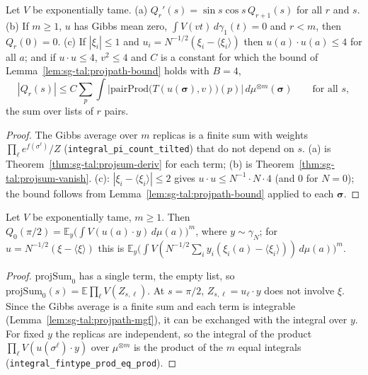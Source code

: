 \begin{lemma}
\label{lem:sg-tal:gibbs-chain}
  \leanok
{}
Let $V$ be exponentially tame.  (a) $Q_r'(s)=\sin s\cos s\,Q_{r+1}(s)$ for all $r$ and $s$.  (b) If $m\ge1$, $u$ has Gibbs mean zero, $\int V(vt)\,d\gamma_1(t)=0$ and $r<m$, then $Q_r(0)=0$.
(c) If $|\xi_i|\le1$ and $u_i=N^{-1/2}(\xi_i-\langle\xi_i\rangle)$ then $u(a)\cdot u(a)\le4$ for all $a$; and if $u\cdot u\le4$, $v^2\le4$ and $C$ is a constant for which the bound of Lemma~\ref{lem:sg-tal:projpath-bound} holds with $B=4$,
\[
|Q_r(s)|\le C\sum_{p}\int\bigl|\mathrm{pairProd}\bigl(T(u(\boldsymbol\sigma),v)\bigr)(p)\bigr|\,d\mu^{\otimes m}(\boldsymbol\sigma)\qquad\text{for all }s,
\]
the sum over lists of $r$ pairs.
\end{lemma}
\begin{proof}
  \leanok
The Gibbs average over $m$ replicas is a finite sum with weights $\prod_\ell e^{f(\sigma^\ell)}/Z$ (\texttt{integral\_pi\_count\_tilted}) that do not depend on $s$.  (a) is Theorem~\ref{thm:sg-tal:projsum-deriv} for each term; (b) is Theorem~\ref{thm:sg-tal:projsum-vanish}.
(c): $|\xi_i-\langle\xi_i\rangle|\le2$ gives $u\cdot u\le N^{-1}\cdot N\cdot4$ (and $0$ for $N=0$); the bound follows from Lemma~\ref{lem:sg-tal:projpath-bound} applied to each $\boldsymbol\sigma$.
\end{proof}

\begin{lemma}[The endpoint $s=\pi/2$ is the $m$-th power of the Gibbs average]
\label{lem:sg-tal:gibbs-endpoint}
  \leanok
{}
Let $V$ be exponentially tame, $m\ge1$.  Then $Q_0(\pi/2)=\mathbb E_y\bigl(\int V(u(a)\cdot y)\,d\mu(a)\bigr)^m$, where $y\sim\gamma_N$; for $u=N^{-1/2}(\xi-\langle\xi\rangle)$ this is $\mathbb E_y\bigl(\int V(N^{-1/2}\sum_iy_i(\xi_i(a)-\langle\xi_i\rangle))\,d\mu(a)\bigr)^m$.
\end{lemma}
\begin{proof}
  \leanok
$\mathrm{projSum}_0$ has a single term, the empty list, so $\mathrm{projSum}_0(s)=\mathbb E\prod_\ell V(Z_{s,\ell})$.  At $s=\pi/2$, $Z_{s,\ell}=u_\ell\cdot y$ does not involve $\xi$.  Since the Gibbs average is a finite sum and each term is integrable
(Lemma~\ref{lem:sg-tal:projpath-mgf}), it can be exchanged with the integral over $y$.  For fixed $y$ the replicas are independent, so the integral of the product $\prod_\ell V(u(\sigma^\ell)\cdot y)$ over $\mu^{\otimes m}$ is the product of the $m$ equal integrals
(\texttt{integral\_fintype\_prod\_eq\_prod}).
\end{proof}


